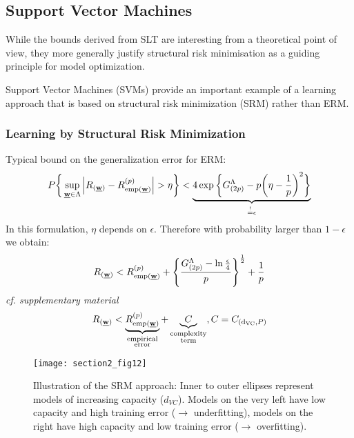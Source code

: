 \subsection{Support Vector Machines} \label{sec:SVM} While the bounds
derived from SLT are interesting from a theoretical
point of view, they more generally justify structural risk
minimisation as a guiding principle for model optimization.
 
Support Vector Machines (SVMs) provide an important example of a
learning approach that is based on structural risk minimization (SRM)
rather than ERM.

\subsubsection{Learning by Structural Risk Minimization}
Typical bound on the generalization error for ERM:
\begin{equation}
	P \bigg\{ \sup_{\underline{\mathbf{w}} \in \Lambda} \Big| R_{(\underline{\mathbf{w}})} 
		- R_{\operatorname{emp} (\underline{\mathbf{w}})}^{(p)} \Big| > \eta \bigg\} 
	< \underbrace{ 4 \exp \bigg\{ G_{(2p)}^\Lambda - p 
		\bigg( \eta - \frac{1}{p} \bigg)^2 \bigg\} }_{
			\stackrel{\mathrm{!}}{=} \epsilon}
\end{equation}
In this formulation, $\eta$ depends on $\epsilon$. Therefore with
probability larger than $1 - \epsilon$ we obtain:
\begin{equation}
	R_{(\underline{\mathbf{w}})} < R_{\operatorname{emp} (\underline{\mathbf{w}})}^{(p)} + \Bigg\{
		\frac{G_{(2p)}^\Lambda - \ln \frac{\epsilon}{4}}{p}
		\Bigg\}^{\frac{1}{2}} + \frac{1}{p}
\end{equation}
{\it cf. supplementary material}
\begin{equation}
	R_{(\underline{\mathbf{w}})} < \underbrace{ R_{\operatorname{emp} (\underline{\mathbf{w}})}^{(p)} }_{ \substack{\text{empirical} 
		\\ \text{error}}} 
		+ \underbrace{C}_{
		\substack{ \text{complexity} \\ \text{term}}}
		, C = C_{(\mathrm{d}_{\mathrm{VC}},P)}
\end{equation}

\begin{figure}[h]
  \centering
\texttt{[image: section2\_fig12]}  
  \caption{Illustration of the SRM approach: Inner to outer ellipses represent models of increasing capacity ($d_{VC}$). Models on the very left have low capacity and high training error ($\rightarrow$ underfitting), models on the right have high capacity and low training error ($\rightarrow$ overfitting).}
  \label{fig:SRM-principle}
\end{figure}


